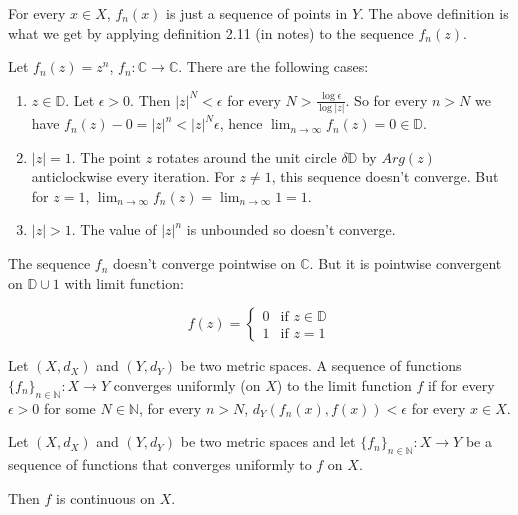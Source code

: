 \begin{remark}
	For every $x \in X$, $f_n(x)$ is just a sequence of points in $Y$. The above definition is what we get by applying definition 2.11 (in notes) to the sequence $f_n(z)$.
\end{remark}

\begin{example}
	Let $f_n(z) = z^n$, $f_n: \mathbb{C} \rightarrow \mathbb{C}$. There are the following cases:

	\begin{enumerate}
		\item $z \in \mathbb{D}$. Let $\epsilon > 0$. Then $|z|^N < \epsilon$ for every $N > \frac{\log \epsilon}{\log |z|}$. So for every $n > N$ we have $f_n(z) - 0 = |z|^n < |z|^N \epsilon$, hence $\lim_{n \rightarrow \infty} f_n(z) = 0 \in \mathbb{D}$.
		\item $|z| = 1$. The point $z$ rotates around the unit circle $\delta \mathbb{D}$ by $Arg(z)$ anticlockwise every iteration. For $z \ne 1$, this sequence doesn't converge. But for $z = 1$, $\lim_{n \rightarrow \infty} f_n(z) = \lim_{n \rightarrow \infty} 1 = 1$.
		\item $|z| > 1$. The value of $|z|^n$ is unbounded so doesn't converge.
	\end{enumerate}

	The sequence $f_n$ doesn't converge pointwise on $\mathbb{C}$. But it is pointwise convergent on $\mathbb{D} \cup {1}$ with limit function:

	\begin{equation}
		f(z) =
		\begin{cases}
			0 & \text{if } z \in \mathbb{D}\\
			1 & \text{if } z = 1
		\end{cases}
	\end{equation}
\end{example}

\begin{definition}
	Let $(X, d_X)$ and $(Y, d_Y)$ be two metric spaces. A sequence of functions ${\{f_n\}}_{n \in \mathbb{N}}: X \rightarrow Y$ converges uniformly (on $X$) to the limit function $f$ if for every $\epsilon > 0$ for some $N \in \mathbb{N}$, for every $n > N$, $d_Y(f_n(x), f(x)) < \epsilon$ for every $x \in X$.
\end{definition}

\begin{theorem}
	Let $(X, d_X)$ and $(Y, d_Y)$ be two metric spaces and let ${\{f_n\}}_{n \in \mathbb{N}}: X \rightarrow Y$ be a sequence of functions that converges uniformly to $f$ on $X$.

	Then $f$ is continuous on $X$.
\end{theorem}

